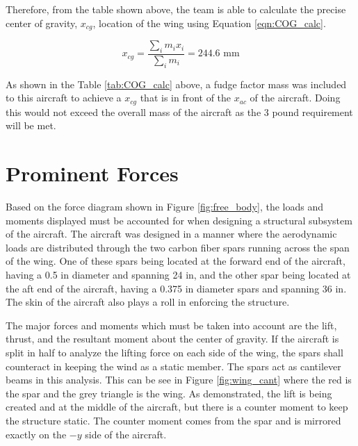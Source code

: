     Therefore, from the table shown above, the team is able to calculate the precise center of gravity, $x_{cg}$, location of the wing using Equation \ref{eqn:COG_calc}.
    
    \begin{equation} \label{eqn:COG_calc}
        x_{cg} = \frac{\sum_i m_i x_i }{\sum_i m_i} = 244.6 \text{ mm}
    \end{equation}
    
    As shown in the Table \ref{tab:COG_calc} above, a fudge factor mass was included to this aircraft to achieve a $x_{cg}$ that is in front of the $x_{ac}$ of the aircraft. Doing this would not exceed the overall mass of the aircraft as the 3 pound requirement will be met.
    
\section{Prominent Forces}

    Based on the force diagram shown in Figure \ref{fig:free_body}, the loads and moments displayed must be accounted for when designing a structural subsystem of the aircraft. The aircraft was designed in a manner where the aerodynamic loads are distributed through the two carbon fiber spars running across the span of the wing. One of these spars being located at the forward end of the aircraft, having a 0.5 in diameter and spanning 24 in, and the other spar being located at the aft end of the aircraft, having a 0.375 in diameter spars and spanning 36 in. The skin of the aircraft also plays a roll in enforcing the structure. 
    
    The major forces and moments which must be taken into account are the lift, thrust, and the resultant moment about the center of gravity. If the aircraft is split in half to analyze the lifting force on each side of the wing, the spars shall counteract in keeping the wind as a static member. The spars act as cantilever beams in this analysis. This can be see in Figure \ref{fig:wing_cant} where the red is the spar and the grey triangle is the wing. As demonstrated, the lift is being created and at the middle of the aircraft, but there is a counter moment to keep the structure static. The counter moment comes from the spar and is mirrored exactly on the $-y$ side of the aircraft.
    
